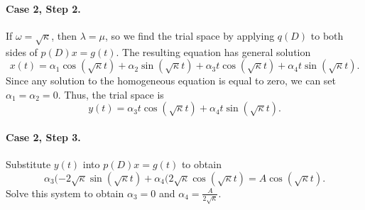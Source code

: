 \documentclass{ximera}
\begin{document}
\begin{exercise}
\begin{solution}
\paragraph{Case 2, Step 2.} If $\omega = \sqrt{\kappa}$, then $\lambda =
\mu$, so we find the trial space by applying $q(D)$ to both sides of
$p(D)x = g(t)$.  The resulting equation has general solution
\[
x(t) = \alpha_1\cos(\sqrt{\kappa}t) + \alpha_2\sin(\sqrt{\kappa}t)
+ \alpha_3t\cos(\sqrt{\kappa}t) + \alpha_4t\sin(\sqrt{\kappa}t).
\]
Since any solution to the homogeneous equation is equal to zero, we can
set $\alpha_1 = \alpha_2 = 0$.  Thus, the trial space is
\[
y(t) = \alpha_3t\cos(\sqrt{\kappa}t) + \alpha_4t\sin(\sqrt{\kappa}t).
\]
\paragraph{Case 2, Step 3.} Substitute $y(t)$ into $p(D)x = g(t)$ to obtain
\[
\alpha_3(-2\sqrt{\kappa}\sin(\sqrt{\kappa}t) +
\alpha_4(2\sqrt{\kappa}\cos(\sqrt{\kappa}t)
= A\cos(\sqrt{\kappa}t).
\]
Solve this system to obtain $\alpha_3 = 0$ and
$\alpha_4 = \frac{A}{2\sqrt{\kappa}}$.


\end{solution}
\end{exercise}
\end{document}
